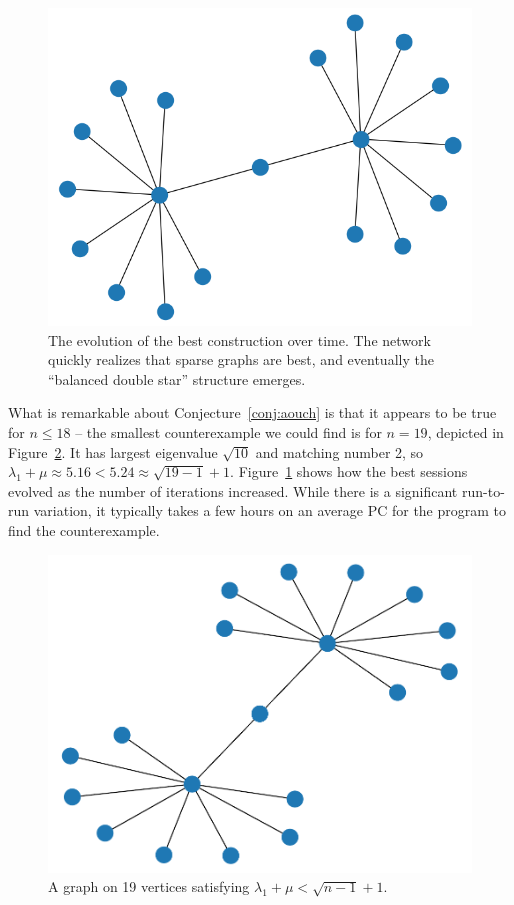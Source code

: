 \documentclass[11pt,english]{article}
\theoremstyle{plain}
\theoremstyle{remark}
\begin{document}
\begin{figure}[hbt]
    \includegraphics[scale=0.2]{timeline/state14.png}
   


    \caption{The evolution of the best construction over time. The network quickly realizes that sparse graphs are best, and eventually the ``balanced double star'' structure emerges.}
    \label{fig:aouch_timeline}
\end{figure}

What is remarkable about Conjecture~\ref{conj:aouch} is that it appears to be true for $n\leq 18$ -- the smallest counterexample we could find is for $n=19$, depicted in Figure~\ref{fig:aouch}. It has largest eigenvalue $\sqrt{10}$ and matching number 2, so $\lambda_1+\mu\approx 5.16 < 5.24\approx \sqrt{19-1}+1. $ Figure~\ref{fig:aouch_timeline} shows how the best sessions evolved as the number of iterations increased. While there is a significant run-to-run variation, it typically takes a few hours on an average PC for the program to find the counterexample.



\begin{figure}[hbt]
    \centering
    \includegraphics[scale=0.45]{aouch.pdf}
    \caption{A graph on 19 vertices satisfying $\lambda_1 + \mu < \sqrt{n-1}+1$.}
    \label{fig:aouch}
\end{figure}
\end{document}

